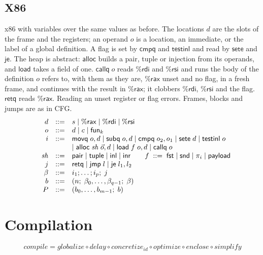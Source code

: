 \documentclass[10pt]{article}
\makeatletter
\theoremstyle{acmplain}
\newcommand{\key}[1]{\mathsf{#1}}
\newcommand{\pass}[1]{\mathit{#1}}
\newcommand{\funref}[1]{\key{fun}_{#1}}
\newenvironment{syntax}{\[\begin{array}{l@{\quad}rcl}}{\end{array}\]}
\makeatother
\begin{document}
\subsection{X86}\label{sec:u-x86}

x86 with variables over the same values as before. The locations $d$ are
the slots of the frame and the registers; an operand $o$ is a location,
an immediate, or the label of a global definition. A flag is set by
$\key{cmpq}$ and $\key{testinl}$ and read by $\key{sete}$ and $\key{je}$.
The heap is abstract: $\key{alloc}$ builds a pair, tuple or injection
from its operands, and $\key{load}$ takes a field of one. $\key{callq}\;o$
reads $\%\key{rdi}$ and $\%\key{rsi}$ and runs the body of the definition
$o$ refers to, with them as they are, $\%\key{rax}$ unset and no flag, in
a fresh frame, and continues with the result in $\%\key{rax}$; it
clobbers $\%\key{rdi}$, $\%\key{rsi}$ and the flag. $\key{retq}$ reads
$\%\key{rax}$. Reading an unset register or flag errors. Frames,
blocks and jumps are as in CFG.
\begin{syntax}
  & d &::=& s \mid \%\key{rax} \mid \%\key{rdi} \mid \%\key{rsi} \\
  & o &::=& d \mid c \mid \funref{k} \\
  & i &::=& \key{movq}\; o, d \mid \key{subq}\; o, d \mid \key{cmpq}\; o_2, o_1
    \mid \key{sete}\; d \mid \key{testinl}\; o \\
  &&& \mid \key{alloc}\; \mathit{sh}\; \vec{o}, d \mid \key{load}\; f\; o, d
    \mid \key{callq}\; o \\
  & \mathit{sh} &::=& \key{pair} \mid \key{tuple} \mid \key{inl} \mid \key{inr}
  \qquad f \;::=\; \key{fst} \mid \key{snd} \mid \pi_i \mid \key{payload} \\
  & j &::=& \key{retq} \mid \key{jmp}\; l \mid \key{je}\; l_1, l_2 \\
  & \beta &::=& i_1; \ldots; i_p;\; j \\
  & b &::=& (n;\; \beta_0, \ldots, \beta_{q-1};\; \beta) \\
  & P &::=& (b_0, \ldots, b_{m-1};\; b)
\end{syntax}

\section{Compilation}\label{sec:u-passes}

\[
  \pass{compile} = \pass{globalize} \circ \pass{delay} \circ \pass{concretize}_{\mathit{id}}
     \circ \pass{optimize} \circ \pass{enclose} \circ \pass{simplify}
\]
\end{document}
